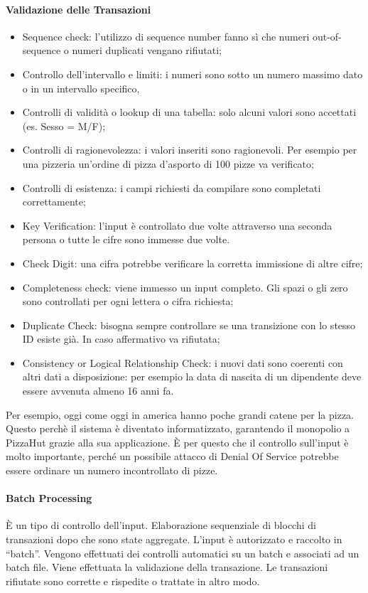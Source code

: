 \paragraph{Validazione delle Transazioni}
\begin{itemize}
	\item Sequence check: l'utilizzo di sequence number fanno sì che numeri
	out-of-sequence o numeri duplicati vengano rifiutati;
	\item Controllo dell'intervallo e limiti: i numeri sono sotto un numero
	massimo dato o in un intervallo specifico,
	\item Controlli di validità o lookup di una tabella:
	solo alcuni valori sono accettati (es. Sesso = M/F);
	\item Controlli di ragionevolezza: i valori inseriti sono ragionevoli.
	Per esempio per una pizzeria un'ordine di pizza d'asporto di 100 pizze
	va verificato;
	\item Controlli di esistenza: i campi richiesti da compilare
	sono completati correttamente;
	\item Key Verification: l'input è controllato due volte attraverso
	una seconda persona o tutte le cifre sono immesse due volte.
	\item Check Digit: una cifra potrebbe verificare la corretta
	immissione di altre cifre;
	\item Completeness check: viene immesso un input completo. Gli
	spazi o gli zero sono controllati per ogni lettera o cifra 
	richiesta;
	\item Duplicate Check: bisogna sempre controllare se una transizione
	con lo stesso ID esiste già. In caso affermativo va rifiutata;
	\item Consistency or Logical Relationship Check: i nuovi dati
	sono coerenti con altri dati a disposizione: per esempio
	la data di nascita di un dipendente deve essere avvenuta almeno
	16 anni fa.
\end{itemize}

Per esempio, oggi come oggi in america hanno poche grandi catene per la pizza.
Questo perchè il sistema è diventato informatizzato, garantendo il monopolio a
PizzaHut grazie alla sua applicazione. È per questo che il controllo sull'input 
è molto importante, perché un possibile attacco di Denial Of Service potrebbe 
essere ordinare un numero incontrollato di pizze.





\paragraph{Batch Processing} 
È un tipo di controllo dell'input.
Elaborazione sequenziale di blocchi di transazioni
dopo che sono state aggregate. 
L'input è autorizzato e raccolto in ``batch''. Vengono effettuati
dei controlli automatici su un batch e associati ad un batch file.
Viene effettuata la validazione della transazione. Le transazioni
rifiutate sono corrette e rispedite o trattate in altro modo.

